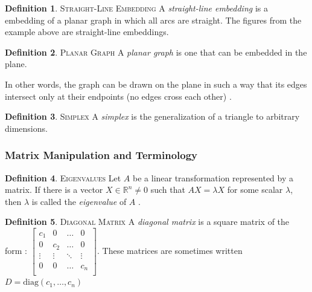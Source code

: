 \documentclass[11pt]{article}
\newcommand{\R}{\mathbb{R}}
\theoremstyle{definition}
\newtheorem{definition}{Definition}[section]
\begin{document}
	\theoremstyle{definition}
	\begin{definition}{\textsc{Straight-Line Embedding}}
		A \emph{straight-line embedding} is a embedding of a planar graph in which all arcs are straight. The figures from the example above are straight-line embeddings.
  	\end{definition}
	
	\theoremstyle{definition}
	\begin{definition}{\textsc{Planar Graph}}
		A \emph{planar graph} is one that can be embedded in the plane.
	\end{definition}
	
	In other words, the graph can be drawn on the plane in such a way that its edges intersect only at their endpoints (no edges cross each other) \cite{mathworld:PlanarGraph}.
	
	\theoremstyle{definition}
	\begin{definition}{\textsc{Simplex}}
		A \emph{simplex} is the generalization of a triangle to arbitrary dimensions.
	\end{definition}

\subsubsection{Matrix Manipulation and Terminology}

	\theoremstyle{definition}
	\begin{definition}{\textsc{Eigenvalues}}
		Let $A$ be a linear transformation represented by a matrix. If there is a vector $X \in \R^n \neq 0$ such that $AX = \lambda X$ for some scalar $\lambda$, then $\lambda$ is called the \emph{eigenvalue} of $A$ \cite{mathworld:Eigenvalue}.
	\end{definition}
	
	\theoremstyle{definition}
	\begin{definition}{\textsc{Diagonal Matrix}}
		A \emph{diagonal matrix} is a square matrix of the form \cite{mathworld:DiagonalMatrix}:
		$\begin{bmatrix}
			c_1 & 0 & \dots & 0 \\
			0 & c_2 & \dots & 0 \\
			\vdots & \vdots  & \ddots  & \vdots \\
			0 & 0 & \dots & c_n \\
		\end{bmatrix}$. These matrices are sometimes written $D = \text{diag}(c_1, \dots, c_n)$
	\end{definition}
	
\end{document}
